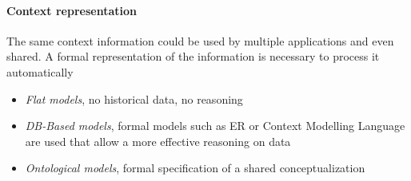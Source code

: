 \paragraph{Context representation}
The same context information could be used by multiple applications and
even shared. A formal representation of the information is necessary to process it automatically

\begin{itemize}
    \item \textit{Flat models}, no historical data, no reasoning
    \item \textit{DB-Based models}, formal models such as ER or Context Modelling Language are used that allow a more effective reasoning on data
    \item \textit{Ontological models}, formal specification of a shared conceptualization
\end{itemize}

\newpage